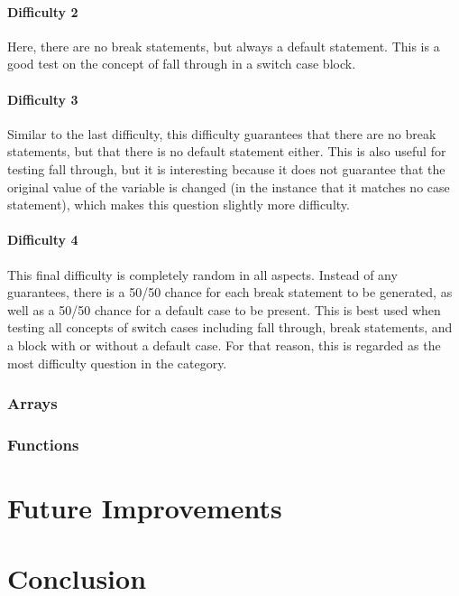 \documentclass{article}
\begin{document}
\paragraph{Difficulty 2} \hfill \par

Here, there are no break statements, but always a default statement. This is a good test on the concept of fall through in a switch case block.

\paragraph{Difficulty 3} \hfill \par

Similar to the last difficulty, this difficulty guarantees that there are no break statements, but that there is no default statement either. This is also useful for testing fall through, but it is 
interesting because it does not guarantee that the original value of the variable is changed (in the instance that it matches no case statement), which makes this question slightly more 
difficulty.

\paragraph{Difficulty 4} \hfill \par

This final difficulty is completely random in all aspects. Instead of any guarantees, there is a 50/50 chance for each break statement to be generated, as well as a 50/50 chance for a default 
case to be present. This is best used when testing all concepts of switch cases including fall through, break statements, and a block with or without a default case. For that reason, this is 
regarded as the most difficulty question in the category. 

\subsubsection{Arrays}


\subsubsection{Functions}


\section{Future Improvements}


\section{Conclusion}
\end{document}
